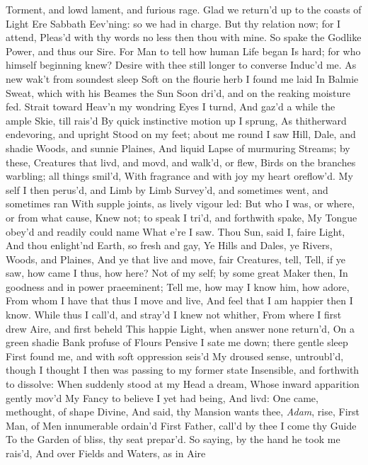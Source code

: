 \documentclass[11pt]{book}
\newcounter {first}
\begin{document}
Torment, and lowd lament, and furious rage. 
Glad we return'd up to the coasts of Light 
Ere Sabbath Eev'ning: so we had in charge. 
But thy relation now; for I attend, 
Pleas'd with thy words no less then thou with mine. 
\quad So spake the Godlike Power, and thus our Sire. 
For Man to tell how human Life began 
Is hard; for who himself beginning knew? 
Desire with thee still longer to converse 
Induc'd me.  As new wak't from soundest sleep 
Soft on the flourie herb I found me laid 
In Balmie Sweat, which with his Beames the Sun 
Soon dri'd, and on the reaking moisture fed. 
Strait toward Heav'n my wondring Eyes I turnd, 
And gaz'd a while the ample Skie, till rais'd 
By quick instinctive motion up I sprung, 
As thitherward endevoring, and upright 
Stood on my feet; about me round I saw 
Hill, Dale, and shadie Woods, and sunnie Plaines, 
And liquid Lapse of murmuring Streams; by these, 
Creatures that livd, and movd, and walk'd, or flew, 
Birds on the branches warbling; all things smil'd, 
With fragrance and with joy my heart oreflow'd. 
My self I then perus'd, and Limb by Limb 
Survey'd, and sometimes went, and sometimes ran 
With supple joints, as lively vigour led: 
But who I was, or where, or from what cause, 
Knew not; to speak I tri'd, and forthwith spake, 
My Tongue obey'd and readily could name 
What e're I saw.  Thou Sun, said I, faire Light, 
And thou enlight'nd Earth, so fresh and gay, 
Ye Hills and Dales, ye Rivers, Woods, and Plaines, 
And ye that live and move, fair Creatures, tell, 
Tell, if ye saw, how came I thus, how here? 
Not of my self; by some great Maker then, 
In goodness and in power praeeminent; 
Tell me, how may I know him, how adore, 
From whom I have that thus I move and live, 
And feel that I am happier then I know. 
While thus I call'd, and stray'd I knew not whither, 
From where I first drew Aire, and first beheld 
This happie Light, when answer none return'd, 
On a green shadie Bank profuse of Flours 
Pensive I sate me down; there gentle sleep 
First found me, and with soft oppression seis'd 
My droused sense, untroubl'd, though I thought 
I then was passing to my former state 
Insensible, and forthwith to dissolve: 
When suddenly stood at my Head a dream, 
Whose inward apparition gently mov'd 
My Fancy to believe I yet had being, 
And livd: One came, methought, of shape Divine, 
And said, thy Mansion wants thee, \textit{Adam}, rise, 
First Man, of Men innumerable ordain'd 
First Father, call'd by thee I come thy Guide 
To the Garden of bliss, thy seat prepar'd. 
So saying, by the hand he took me rais'd, 
And over Fields and Waters, as in Aire 
\end{document}
